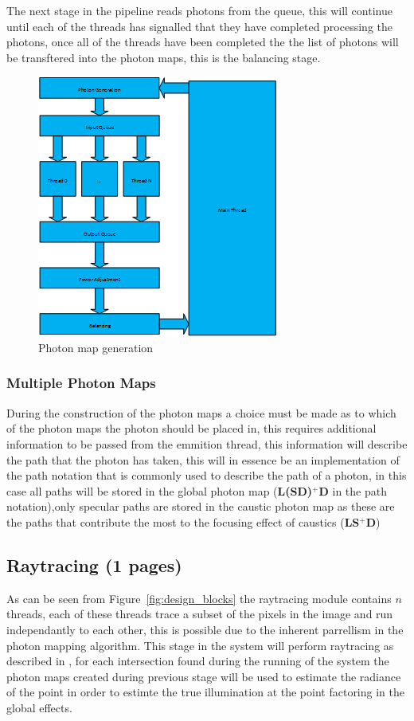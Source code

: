 The next stage in the pipeline reads photons from the queue, this will continue until each of the threads
has signalled that they have completed processing the photons, once all of the threads have been completed the
the list of photons will be transftered into the photon maps, this is the balancing stage.

\begin{figure}
\centering
\includegraphics{./images/photon_threading.png}
\caption{Photon map generation}
\label{fig:photon_generation}
\end{figure}

\subsubsection{Multiple Photon Maps}
During the construction of the photon maps a choice must be made as to which of the photon maps the photon
should be placed in, this requires additional information to be passed from the emmition thread, this information
will describe the path that the photon has taken, this will in essence be an implementation of the path notation
that is commonly used to describe the path of a photon, in this case all paths will be stored in the global photon
map (\textbf{L(S\textbar D)$^+$D} in the path notation),only specular paths are stored in the caustic photon map
as these are the paths that contribute the most to the focusing effect of caustics (\textbf{LS$^+$D})


\subsection{Raytracing (1 pages)}
As can be seen from Figure~\ref{fig:design_blocks} the raytracing module contains $n$ threads, each of these
threads trace a subset of the pixels in the image and run independantly to each other, this is possible due
to the inherent parrellism in the photon mapping algorithm. This stage in the system will perform raytracing
as described in , for each intersection found during the running of the system the photon
maps created during previous stage will be used to estimate the radiance of the point in order to estimte the
true illumination at the point factoring in the global effects.

